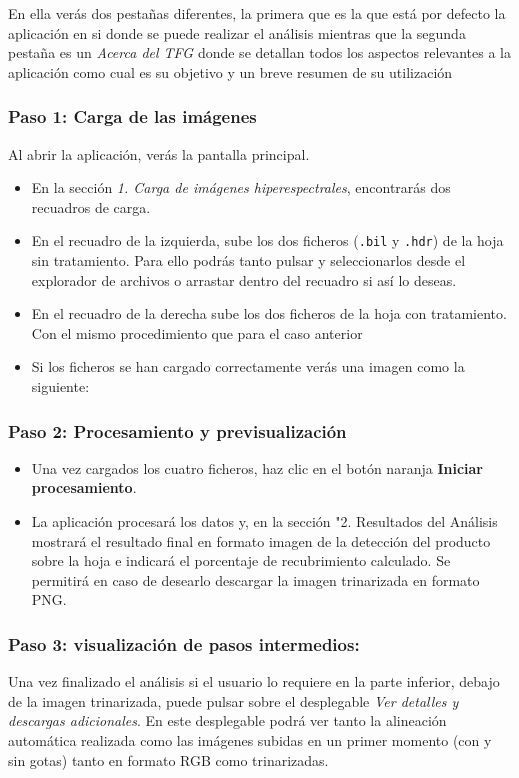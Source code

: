 En ella verás dos pestañas diferentes, la primera que es la que está por defecto la aplicación en si donde se puede realizar el análisis mientras que la segunda pestaña es un \textit{Acerca del TFG} donde se detallan todos los aspectos relevantes a la aplicación como cual es su objetivo y un breve resumen de su utilización

\subsubsection{Paso 1: Carga de las imágenes}
Al abrir la aplicación, verás la pantalla principal.
\begin{itemize}
\item En la sección \textit{1. Carga de imágenes hiperespectrales}, encontrarás dos recuadros de carga.
\item En el recuadro de la izquierda, sube los dos ficheros (\texttt{.bil} y \texttt{.hdr}) de la hoja sin tratamiento. Para ello podrás tanto pulsar y seleccionarlos desde el explorador de archivos o arrastar dentro del recuadro si así lo deseas.
\item En el recuadro de la derecha sube los dos ficheros de la hoja con tratamiento. Con el mismo procedimiento que para el caso anterior
\item Si los ficheros se han cargado correctamente verás una imagen como la siguiente:
\end{itemize}

\subsubsection{Paso 2: Procesamiento y previsualización}
\begin{itemize}
\item Una vez cargados los cuatro ficheros, haz clic en el botón naranja \textbf{Iniciar procesamiento}.
\item La aplicación procesará los datos y, en la sección "2. Resultados del Análisis mostrará el resultado final en formato imagen de la detección del producto sobre la hoja e indicará el porcentaje de recubrimiento calculado. Se permitirá en caso de desearlo descargar la imagen trinarizada en formato PNG.

\end{itemize}

\subsubsection{Paso 3: visualización de pasos intermedios:}
Una vez finalizado el análisis si el usuario lo requiere en la parte inferior, debajo de la imagen trinarizada, puede pulsar sobre el desplegable  \textit{Ver detalles y descargas adicionales}. En este desplegable podrá ver tanto la alineación automática realizada como las imágenes subidas en un primer momento (con y sin gotas) tanto en formato RGB como trinarizadas.

